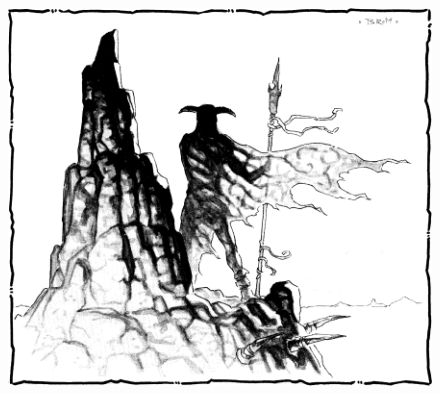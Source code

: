 \begin{figure}[b!]
\centering
\includegraphics[width=\textwidth-2cm]{images/adventurer-2.png}
\WOTC
\end{figure}


